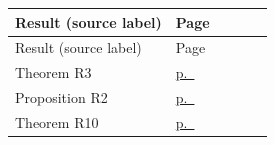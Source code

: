 \begin{center}\footnotesize
\begin{longtable}{@{}L{0.62\linewidth}l@{}}
\toprule Result (source label) & Page \\ \midrule\endfirsthead
\toprule Result (source label) & Page \\ \midrule\endhead
Theorem R3 & \hyperref[pF-res-theorem-R3]{p.~\pageref{pF-res-theorem-R3}} \\
Proposition R2 & \hyperref[pF-res-proposition-R2]{p.~\pageref{pF-res-proposition-R2}} \\
Theorem R10 & \hyperref[pF-res-theorem-R10]{p.~\pageref{pF-res-theorem-R10}} \\
\bottomrule
\end{longtable}
\end{center}
